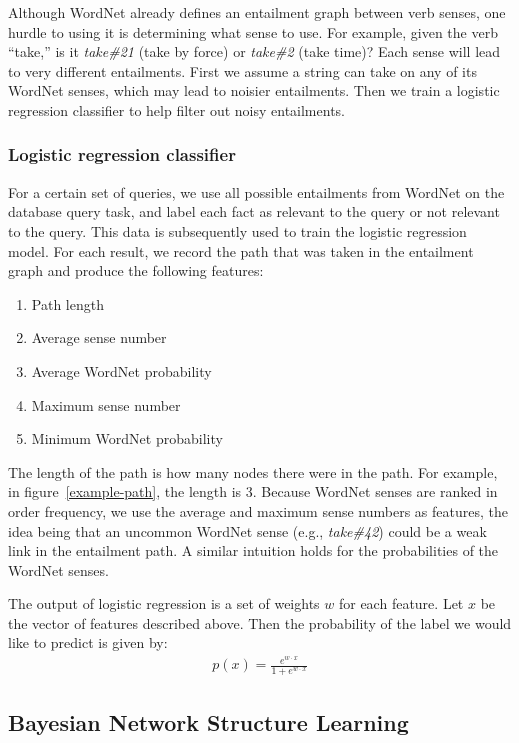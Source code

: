 \documentclass{article}
\begin{document}
Although WordNet already defines an entailment graph between verb senses, one hurdle to using it is determining what sense to use. For example, given the verb ``take,'' is it \textit{take\#21} (take by force) or \textit{take\#2} (take time)? Each sense will lead to very different entailments. First we assume a string can take on any of its WordNet senses, which may lead to noisier entailments. Then we train a logistic regression classifier to help filter out noisy entailments.

\subsubsection{Logistic regression classifier}
For a certain set of queries, we use all possible entailments from WordNet on the database query task, and label each fact as relevant to the query or not relevant to the query. This data is subsequently used to train the logistic regression model. For each result, we record the path that was taken in the entailment graph and produce the following features:
\begin{enumerate}
  \item Path length
  \item Average sense number
  \item Average WordNet probability
  \item Maximum sense number
  \item Minimum WordNet probability
\end{enumerate}

The length of the path is how many nodes there were in the path. For example, in figure~\ref{example-path}, the length is 3. Because WordNet senses are ranked in order frequency, we use the average and maximum sense numbers as features, the idea being that an uncommon WordNet sense (e.g., \textit{take\#42}) could be a weak link in the entailment path. A similar intuition holds for the probabilities of the WordNet senses.

The output of logistic regression is a set of weights $w$ for each feature. Let $x$ be the vector of features described above. Then the probability of the label we would like to predict is given by:
\begin{align*}
  p(x) = \frac{e^{w\cdot x}}{1 + e^{w\cdot x}}
\end{align*} 

\subsection{Bayesian Network Structure Learning}
\end{document}
